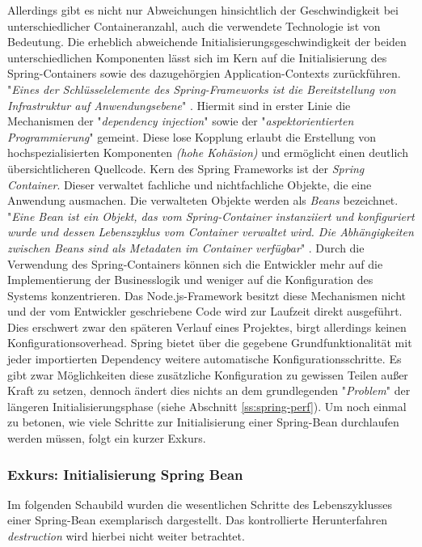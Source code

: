 Allerdings gibt es nicht nur Abweichungen hinsichtlich der Geschwindigkeit bei unterschiedlicher Containeranzahl, auch die verwendete Technologie ist von Bedeutung. Die erheblich abweichende Initialisierungsgeschwindigkeit der beiden unterschiedlichen Komponenten lässt sich im Kern auf die Initialisierung des Spring-Containers sowie des dazugehörgien Application-Contexts zurückführen. "\emph{Eines der Schlüsselelemente des Spring-Frameworks ist die Bereitstellung von Infrastruktur auf Anwendungsebene}" \cite[Seite~53 ff.]{simons-spring}. Hiermit sind in erster Linie die Mechanismen der "\emph{dependency injection}" sowie der "\emph{aspektorientierten Programmierung}" gemeint. Diese lose Kopplung erlaubt die Erstellung von hochspezialisierten Komponenten \emph{(hohe Kohäsion)} und ermöglicht einen deutlich übersichtlicheren Quellcode. Kern des Spring Frameworks ist der \emph{Spring Container}. Dieser verwaltet fachliche und nichtfachliche Objekte, die eine Anwendung ausmachen. Die verwalteten Objekte werden als \emph{Beans} bezeichnet. "\emph{Eine Bean ist ein Objekt, das vom Spring-Container instanziiert und konfiguriert wurde und dessen Lebenszyklus vom Container verwaltet wird. Die Abhängigkeiten zwischen Beans sind als Metadaten im Container verfügbar}" \cite[Kapitel~3.1.1]{simons-spring}. Durch die Verwendung des Spring-Containers können sich die Entwickler mehr auf die Implementierung der Businesslogik und weniger auf die Konfiguration des Systems konzentrieren. Das Node.js-Framework besitzt diese Mechanismen nicht und der vom Entwickler geschriebene Code wird zur Laufzeit direkt ausgeführt. Dies erschwert zwar den späteren Verlauf eines Projektes, birgt allerdings keinen Konfigurationsoverhead. Spring bietet über die gegebene Grundfunktionalität mit jeder importierten Dependency weitere automatische Konfigurationsschritte. Es gibt zwar Möglichkeiten diese zusätzliche Konfiguration zu gewissen Teilen außer Kraft zu setzen, dennoch ändert dies nichts an dem grundlegenden "\emph{Problem}" der längeren Initialisierungsphase (siehe Abschnitt \ref{ss:spring-perf}). Um noch einmal zu betonen, wie viele Schritte zur Initialisierung einer Spring-Bean durchlaufen werden müssen, folgt ein kurzer Exkurs.

\subsubsection{Exkurs: Initialisierung Spring Bean}
Im folgenden Schaubild wurden die wesentlichen Schritte des Lebenszyklusses einer Spring-Bean exemplarisch dargestellt. Das kontrollierte Herunterfahren \emph{destruction} wird hierbei nicht weiter betrachtet. 


